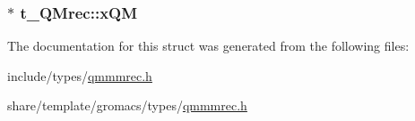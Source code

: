 \hypertarget{structt__QMrec_ad24a73d770a09aaf31bf053d345fc6c9}{
\subsubsection[{x\-Q\-M}]{ $\ast$ {\bf t\-\_\-\-Q\-Mrec\-::x\-Q\-M}}}\label{structt__QMrec_ad24a73d770a09aaf31bf053d345fc6c9}


\-The documentation for this struct was generated from the following files\-:\begin{DoxyCompactItemize}
\item 
include/types/\hyperlink{include_2types_2qmmmrec_8h}{qmmmrec.\-h}\item 
share/template/gromacs/types/\hyperlink{share_2template_2gromacs_2types_2qmmmrec_8h}{qmmmrec.\-h}\end{DoxyCompactItemize}
